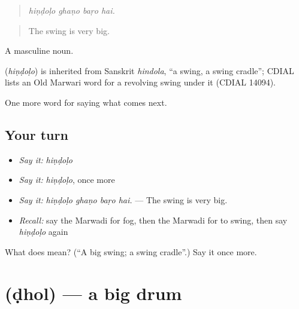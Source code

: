 \begin{quote}
   
\end{quote}

\begin{quote}
\emph{hiṇḍoḷo ghaṇo baṛo hai.}
\end{quote}

\begin{quote}
The swing is very big.
\end{quote}

A masculine noun.

\begin{cousinweb}
\textbf{} (\emph{hiṇḍoḷo}) is inherited from Sanskrit \emph{hindola}, \textquotedblleft{}a swing, a swing cradle\textquotedblright{}; CDIAL lists an Old Marwari word for a revolving swing under it (CDIAL 14094).
\end{cousinweb}

\begin{grammarlens}[title={What you've built}]
One more word for saying what comes next.
\end{grammarlens}

\subsection*{Your turn}
\begin{itemize}
\raggedright
  \item \emph{Say it:} \emph{hiṇḍoḷo}
  \item \emph{Say it:} \emph{hiṇḍoḷo}, once more
  \item \emph{Say it:} \emph{hiṇḍoḷo ghaṇo baṛo hai.} — The swing is very big.
  \item \emph{Recall:} say the Marwadi for fog, then the Marwadi for to swing, then say \emph{hiṇḍoḷo} again
\end{itemize}

\begin{tcolorbox}[breakable,colback=teal!4,colframe=teal!35!black,title={Before you move on}]
What does  mean? (\textquotedblleft{}A big swing; a swing cradle\textquotedblright{}.) Say it once more.
\end{tcolorbox}
\section[\texorpdfstring{\mw{ढोल} (ḍhol)}{ढोल (ḍhol)}]{ (ḍhol) — a big drum}

\label{lesson:MW-C223-dhol}



